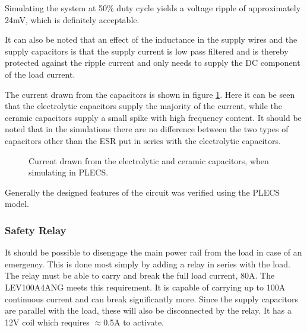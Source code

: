 Simulating the system at 50\% duty cycle yields a voltage ripple of approximately 24mV, which is definitely acceptable. 

It can also be noted that an effect of the inductance in the supply wires and the supply capacitors is that the supply current is low pass filtered and is thereby protected against the ripple current and only needs to supply the DC component of the load current.

The current drawn from the capacitors is shown in figure \ref{fig:cap_currents}.
Here it can be seen that the electrolytic capacitors supply the majority of the current, while the ceramic capacitors supply a small spike with high frequency content.
It should be noted that in the simulations there are no difference between the two types of capacitors other than the ESR put in series with the electrolytic capacitors. 

\begin{figure}[h]
	\centering
    
	\caption{Current drawn from the electrolytic and ceramic capacitors, when simulating in PLECS. }
	\label{fig:cap_currents}
\end{figure}

Generally the designed features of the circuit was verified using the PLECS model.

\subsubsection{Safety Relay} %
\label{ssub:safety_relay}
It should be possible to disengage the main power rail from the load in case of an emergency.
This is done most simply by adding a relay in series with the load.
The relay must be able to carry and break the full load current, 80A.
The LEV100A4ANG meets this requirement. 
It is capable of carrying up to 100A continuous current and can break significantly more.
Since the supply capacitors are parallel with the load, these will also be disconnected by the relay.
It has a 12V coil which requires $\approx$0.5A to activate.

